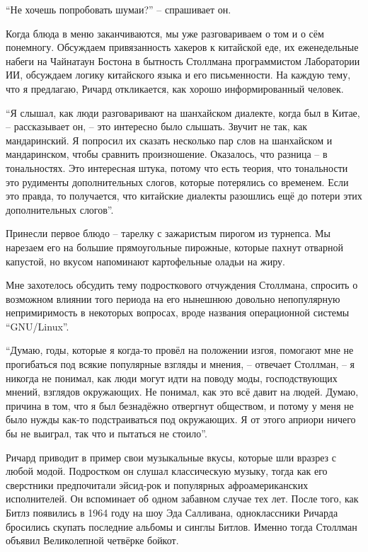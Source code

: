 \enquote{Не хочешь попробовать шумаи?} -- спрашивает он.

Когда блюда в меню заканчиваются, мы уже разговариваем о том и о сём понемногу. Обсуждаем привязанность хакеров к китайской еде, их еженедельные набеги на Чайнатаун Бостона в бытность Столлмана программистом Лаборатории ИИ, обсуждаем логику китайского языка и его письменности. На каждую тему, что я предлагаю, Ричард откликается, как хорошо информированный человек.

\enquote{Я слышал, как люди разговаривают на шанхайском диалекте, когда был в Китае, -- рассказывает он, -- это интересно было слышать. Звучит не так, как мандаринский. Я попросил их сказать несколько пар слов на шанхайском и мандаринском, чтобы сравнить произношение. Оказалось, что разница -- в тональностях. Это интересная штука, потому что есть теория, что тональности это рудименты дополнительных слогов, которые потерялись со временем. Если это правда, то получается, что китайские диалекты разошлись ещё до потери этих дополнительных слогов}.

Принесли первое блюдо -- тарелку с зажаристым пирогом из турнепса. Мы нарезаем его на большие прямоугольные пирожные, которые пахнут отварной капустой, но вкусом напоминают картофельные оладьи на жиру.

Мне захотелось обсудить тему подросткового отчуждения Столлмана, спросить о возможном влиянии того периода на его нынешнюю довольно непопулярную непримиримость в некоторых вопросах, вроде названия операционной системы \enquote{GNU/Linux}.

\enquote{Думаю, годы, которые я когда-то провёл на положении изгоя, помогают мне не прогибаться под всякие популярные взгляды и мнения, -- отвечает Столлман, -- я никогда не понимал, как люди могут идти на поводу моды, господствующих мнений, взглядов окружающих. Не понимал, как это всё давит на людей. Думаю, причина в том, что я был безнадёжно отвергнут обществом, и потому у меня не было нужды как-то подстраиваться под окружающих. Я от этого априори ничего бы не выиграл, так что и пытаться не стоило}.

Ричард приводит в пример свои музыкальные вкусы, которые шли вразрез с любой модой. Подростком он слушал классическую музыку, тогда как его сверстники предпочитали эйсид-рок и популярных афроамериканских исполнителей. Он вспоминает об одном забавном случае тех лет. После того, как Битлз появились в 1964 году на шоу Эда Салливана, одноклассники Ричарда бросились скупать последние альбомы и синглы Битлов. Именно тогда Столлман объявил Великолепной четвёрке бойкот.

